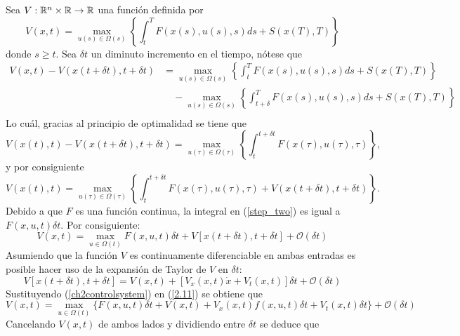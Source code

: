 Sea $V: \mathbb R^n \times \mathbb R \to \mathbb R$ una función definida por
\begin{equation}
    \label{value_function}
    V(x,t) = \max_{u(s)\in \Omega(s)}\left\{\int_t^T F(x(s), u(s), s)ds + S(x(T), T)\right\}
\end{equation}
donde $s \geq t$.
Sea $\delta t$ un diminuto incremento en el tiempo, nótese que 
\begin{align*}
    V(x,t) - V(x(t + \delta t), t + \delta t) &= \max_{u(s)\in \Omega(s)}\left\{\int_t^T F(x(s), u(s), s)ds + S(x(T), T)\right\}  \\
    & \quad - \max_{u(s)\in \Omega(s)}\left\{\int_{t+ \delta}^T F(x(s), u(s), s)ds + S(x(T), T)\right\} \\
\end{align*}
Lo cuál, gracias al principio de optimalidad \cite{optimal_principle} se tiene que 
\begin{equation}
    \label{step_one}
   V(x(t), t) - V(x(t + \delta t), t + \delta t) = \max_{u(\tau)\in \Omega(\tau)} \left\{ \int_{t}^{t+ \delta t} F(x(\tau), u(\tau), \tau)\right\},
\end{equation} 
y por consiguiente
\begin{equation}
    \label{step_two}
    V(x(t), t) = \max_{u(\tau)\in \Omega(\tau)} \left\{ \int_{t}^{t+ \delta t} F(x(\tau), u(\tau), \tau) + V(x(t + \delta t), t + \delta t)\right\}.
 \end{equation} 
 Debido a que $F$ es una función continua, la integral en (\ref{step_two}) es igual a $F(x,u,t)\delta t$. Por consiguiente:
 \begin{equation}
    \label{2.11}
     V(x,t) = \max_{u\in \Omega(t)} F(x,u,t)\delta t + V[x(t+\delta t), t + \delta t] + \mathcal O(\delta t)
 \end{equation} 
 Asumiendo que la función $V$ es continuamente diferenciable en ambas entradas es posible hacer uso de la expansión de Taylor de $V$ en $\delta t$:
 \begin{equation}
    V[x(t + \delta t), t + \delta t] = V(x,t) + [V_x(x,t)\dot x + V_t(x,t)]\delta t + \mathcal O(\delta t)
 \end{equation}
 Sustituyendo (\ref{ch2controlsystem}) en (\ref{2.11}) se obtiene que 
 \begin{equation}
     V(x,t) = \max_{u\in \Omega(t)} \{F(x,u,t)\delta t + V(x,t) + V_x(x,t)f(x,u,t)\delta t + V_t(x,t)\delta t\} + \mathcal O(\delta t)
 \end{equation}
Cancelando $V(x,t)$ de ambos lados y dividiendo entre $\delta t$ se deduce que
